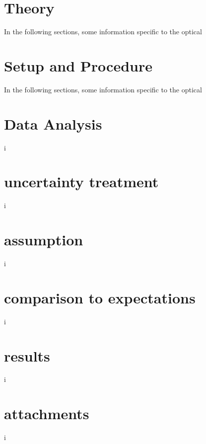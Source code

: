 \documentclass{article}
\begin{document}
\section{Theory}
\label{sec: theory}
In the following sections, some information specific to the optical
\newpage
\section{Setup and Procedure}
In the following sections, some information specific to the optical
\newpage
\section{Data Analysis}
i
\newpage
\section{uncertainty treatment}
i
\newpage
\section{assumption}
i
\newpage
\section{comparison to expectations }
i
\newpage
\section{results}
i
\newpage
\section{attachments}
i
\end{document}
